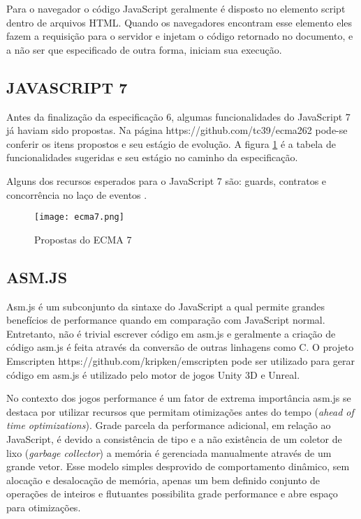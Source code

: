 Para o navegador o código JavaScript geralmente é disposto no elemento
script dentro de arquivos HTML. Quando os navegadores encontram esse
elemento eles fazem a requisição para o servidor e injetam o código
retornado no documento, e a não ser que especificado de outra forma,
iniciam sua execução.

\subsection{JAVASCRIPT 7}

Antes da finalização da especificação 6, algumas funcionalidades
do JavaScript 7 já haviam sido propostas. Na página
https://github.com/tc39/ecma262 pode-se conferir os itens propostos e
seu estágio de evolução. A figura \ref{fig:ecma7} é a tabela de
funcionalidades sugeridas e seu estágio no caminho da especificação.

Alguns dos recursos esperados para o JavaScript 7 são: guards,
contratos e concorrência no laço de eventos \autocite{ecma7}.

\begin{figure}
    \centering
    \texttt{[image: ecma7.png]}
	\caption{Propostas do ECMA 7}
    \label{fig:ecma7}
\end{figure}

\subsection{ASM.JS}%

Asm.js é um subconjunto da sintaxe do JavaScript a qual permite
grandes benefícios de performance quando em comparação com
JavaScript normal. Entretanto, não é trivial escrever código em
asm.js e geralmente a criação de código asm.js é feita através
da conversão de outras linhagens como C. O projeto Emscripten
https://github.com/kripken/emscripten pode ser utilizado para gerar
código em asm.js é utilizado pelo motor de jogos Unity 3D e Unreal.

No contexto dos jogos performance é um fator de extrema importância
asm.js se destaca por utilizar recursos que permitam otimizações
antes do tempo (\textit{ahead of time optimizations}). Grade parcela
da performance adicional, em relação ao JavaScript, é devido a
consistência de tipo e a não existência de um coletor de lixo
(\textit{garbage collector}) a memória é gerenciada manualmente
através de um grande vetor. Esse modelo simples desprovido de
comportamento dinâmico, sem alocação e desalocação de memória,
apenas um bem definido conjunto de operações de inteiros e flutuantes
possibilita grade performance e abre espaço para otimizações.

